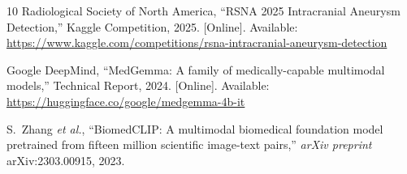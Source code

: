 \documentclass[journal]{IEEEtran}
\begin{document}
\begin{thebibliography}{10}
Radiological Society of North America,
``RSNA 2025 Intracranial Aneurysm Detection,''
Kaggle Competition, 2025.
[Online]. Available: \url{https://www.kaggle.com/competitions/rsna-intracranial-aneurysm-detection}

Google DeepMind,
``MedGemma: A family of medically-capable multimodal models,''
Technical Report, 2024.
[Online]. Available: \url{https://huggingface.co/google/medgemma-4b-it}

S.~Zhang \textit{et al.},
``BiomedCLIP: A multimodal biomedical foundation model pretrained from
fifteen million scientific image-text pairs,''
\textit{arXiv preprint} arXiv:2303.00915, 2023.

\end{thebibliography}
\end{document}
